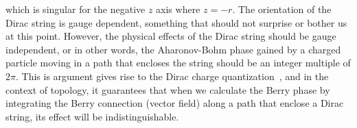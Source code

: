 %
which is singular for the negative $z$ axis where $z=-r$. The orientation of the Dirac string is gauge dependent, something that should not surprise or bother us at this point. However, the physical effects of the Dirac string should be gauge independent, or in other words, the Aharonov-Bohm phase gained by a charged particle moving in a path that encloses the string should be an integer multiple of $2\pi$. This is argument gives rise to the Dirac charge quantization~\cite{dirac_paul_adrien_maurice_quantised_1931}, and in the context of topology, it guarantees that when we calculate the Berry phase by integrating the Berry connection (vector field) along a path that enclose a Dirac string, its effect will be indistinguishable. 






